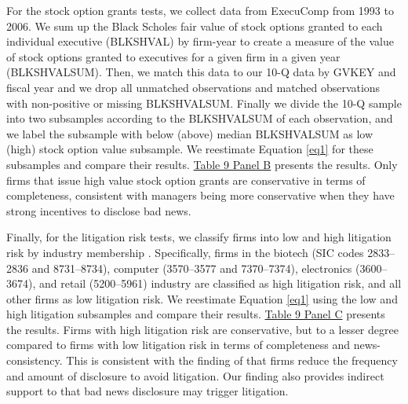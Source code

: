 \documentclass[letterpaper,12pt]{article}
\begin{document}
\begin{spacing}{1.5}
For the stock option grants tests, we collect data from ExecuComp from 1993 to 2006. We sum up the Black Scholes fair value of stock options granted to each individual executive (BLKSHVAL) by firm-year to create a measure of the value of stock options granted to executives for a given firm in a given year (BLKSHVALSUM). Then, we match this data to our 10-Q data by GVKEY and fiscal year and we drop all unmatched observations and matched observations with non-positive or missing BLKSHVALSUM. Finally we divide the 10-Q sample into two subsamples according to the BLKSHVALSUM of each observation, and we label the subsample with below (above) median BLKSHVALSUM as low (high) stock option value subsample. We reestimate Equation \eqref{eq1} for these subsamples and compare their results. \hyperref[T9]{Table 9 Panel B} presents the results. Only firms that issue high value stock option grants are conservative in terms of completeness, consistent with managers being more conservative when they have strong incentives to disclose bad news.

Finally, for the litigation risk tests, we classify firms into low and high litigation risk by industry membership \cite{francisShareholderLitigationCorporate1994,kimMeasuringSecuritiesLitigation2012}. Specifically, firms in the biotech (SIC codes 2833–2836 and 8731–8734), computer (3570–3577 and 7370–7374), electronics (3600–3674), and retail (5200–5961) industry are classified as high litigation risk, and all other firms as low litigation risk. We reestimate Equation \eqref{eq1} using the low and high litigation subsamples and compare their results. \hyperref[T9]{Table 9 Panel C} presents the results. Firms with high litigation risk are conservative, but to a lesser degree compared to firms with low litigation risk in terms of completeness and news-consistency. This is consistent with the finding of  that firms reduce the frequency and amount of disclosure to avoid litigation. Our finding also provides indirect support to  that bad news disclosure may trigger litigation.

\begin{comment}
\subsection{Bundling}
Using 8-K filings from 2005 to 2013, \citeA{segalAreManagersStrategic2016} find that managers strategically report negative news after trading hours when they believe that investor attention is low, and that firms bundle good and bad news disclosure to mitigate the negative impact of the latter. Consistent with \citeA{segalAreManagersStrategic2016}, \citeA{niessnerStrategicDisclosureTiming2015} find that managers systematically disclose bad news when investors are more distracted, and that this strategic disclosure of bad news is often accompanied with insider trading and earnings management. In sum, strategic delay or timing of bad news disclosure distorts the market and brings undesirable economic consequences.
\end{comment}


\end{spacing}
\end{document}
